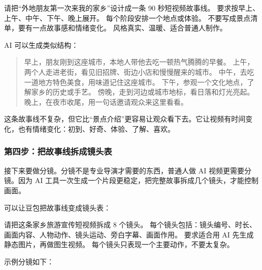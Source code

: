 \begin{tcolorbox}[promptbox]
请把“外地朋友第一次来我的家乡”设计成一条 90 秒短视频故事线。
要求按早上、上午、中午、下午、晚上展开。
每个阶段安排一个地点或体验。
不要写成景点清单，要有一点故事感和情绪变化。
风格真实、温暖、适合普通人制作。
\end{tcolorbox}

AI 可以生成类似结构：
\begin{quote}
早上，朋友刚到这座城市，本地人带他去吃一顿热气腾腾的早餐。
上午，两个人走进老街，看见旧招牌、街边小店和慢慢醒来的城市。
中午，去吃一道地方特色美食，用味道记住这座城市。
下午，参观一个文化地点，了解家乡的历史或手艺。
傍晚，走到河边或城市地标，看日落和灯光亮起。
晚上，在夜市收尾，用一句话邀请观众来这里看看。
\end{quote}

这条故事线不复杂，但它比“景点介绍”更容易让观众看下去。它让视频有时间变化，也有情绪变化：初到、好奇、体验、了解、喜欢。

\subsubsection*{第四步：把故事线拆成镜头表}

接下来要做分镜。分镜不是专业导演才需要的东西，普通人做 AI 视频更需要分镜。因为 AI 工具一次生成一个片段更稳定，把完整故事拆成几个镜头，才能控制画面。

可以让豆包把故事线变成镜头表：

\begin{tcolorbox}[promptbox]
请把这条家乡旅游宣传短视频拆成 8 个镜头。
每个镜头包括：镜头编号、时长、画面内容、人物动作、镜头运动、旁白字幕、画面作用。
要求适合用 AI 先生成静态图片，再做图生视频。
每个镜头只表现一个主要动作，不要太复杂。
\end{tcolorbox}

示例分镜如下：

